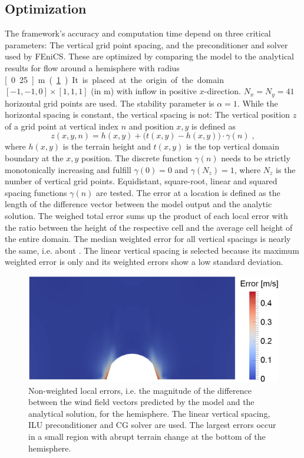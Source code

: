 \documentclass[twocolumn,letterpaper]{IEEEAerospaceCLS}
\begin{document}
\subsection{Optimization}

The framework's accuracy and computation time depend on three critical parameters: The vertical grid point spacing, and the preconditioner and solver used by FEniCS. These are optimized by comparing the model to the analytical results for flow around a hemisphere with radius \unit[0.25]{m} (\cref{fig:PL_WindPred_Impl_HemiError}). It is placed at the origin of the domain $[-1, -1, 0] \times [1, 1, 1]$ (in m) with  inflow in positive $x$-direction. $N_x=N_y=41$ horizontal grid points are used. The stability parameter is $\alpha=1$. While the horizontal spacing is constant, the vertical spacing is not: The vertical position $z$ of a grid point at vertical index $n$ and position $x,y$ is defined as
\begin{equation}
z(x, y, n) = h(x, y) + \big(t(x, y) - h(x, y) \big) \cdot \gamma(n) \; ,
\end{equation}
where $h(x, y)$ is the terrain height and $t(x, y)$ is the top vertical domain boundary at the $x,y$ position. The discrete function $\gamma(n)$ needs to be strictly monotonically increasing and fulfill $\gamma(0) = 0$ and $\gamma(N_z) = 1$, where $N_z$ is the number of vertical grid points. Equidistant, square-root, linear and squared spacing functions $\gamma(n)$ are tested. The error at a location is defined as the length of the difference vector between the model output and the analytic solution. The weighed total error sums up the product of each local error with the ratio between the height of the respective cell and the average cell height of the entire domain. The median weighted error for all vertical spacings is nearly the same, i.e. about . The linear vertical spacing is selected because its maximum weighted error is only  and its weighted errors show a low standard deviation.

\begin{figure}[bth]
\centering
\includegraphics[width=\columnwidth]{images/WindPred/Implementation/error_hemi.png}
\caption[Hemisphere error]{Non-weighted local errors, i.e. the magnitude of the difference between the wind field vectors predicted by the model and the analytical solution, for the hemisphere. The linear vertical spacing, ILU preconditioner and CG solver are used. The largest errors occur in a small region with abrupt terrain change at the bottom of the hemisphere.}
\label{fig:PL_WindPred_Impl_HemiError}
\end{figure}
\end{document}
